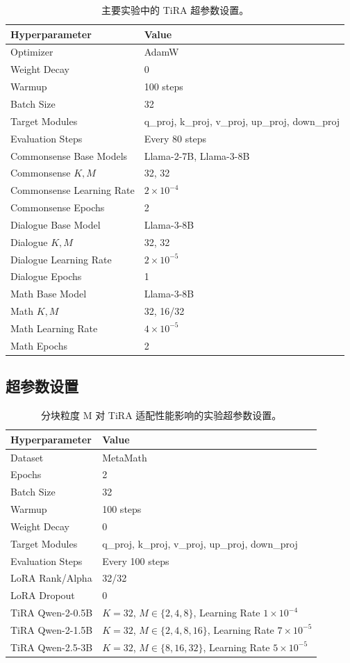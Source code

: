 ﻿\documentclass[UTF8,a4paper,11pt]{ctexart}
\begin{document}
\begin{table}[H]
\centering
\caption{主要实验中的 TiRA 超参数设置。}
\begin{tabular}{ll}
\toprule
Hyperparameter & Value \\
\midrule
Optimizer & AdamW \\
Weight Decay & 0 \\
Warmup & 100 steps \\
Batch Size & 32 \\
Target Modules & q\_proj, k\_proj, v\_proj, up\_proj, down\_proj \\
Evaluation Steps & Every 80 steps \\
\midrule
Commonsense Base Models & Llama-2-7B, Llama-3-8B \\
Commonsense $K,M$ & 32, 32 \\
Commonsense Learning Rate & $2\times10^{-4}$ \\
Commonsense Epochs & 2 \\
\midrule
Dialogue Base Model & Llama-3-8B \\
Dialogue $K,M$ & 32, 32 \\
Dialogue Learning Rate & $2\times10^{-5}$ \\
Dialogue Epochs & 1 \\
\midrule
Math Base Model & Llama-3-8B \\
Math $K,M$ & 32, 16/32 \\
Math Learning Rate & $4\times10^{-5}$ \\
Math Epochs & 2 \\
\bottomrule
\end{tabular}
\end{table}

\subsection{超参数设置}
\label{app:ablation_hyperparams}

\begin{table}[H]
\centering
\caption{分块粒度 M 对 TiRA 适配性能影响的实验超参数设置。}
\begin{tabular}{ll}
\toprule
Hyperparameter & Value \\
\midrule
Dataset & MetaMath \\
Epochs & 2 \\
Batch Size & 32 \\
Warmup & 100 steps \\
Weight Decay & 0 \\
Target Modules & q\_proj, k\_proj, v\_proj, up\_proj, down\_proj \\
Evaluation Steps & Every 100 steps \\
\midrule
LoRA Rank/Alpha & 32/32 \\
LoRA Dropout & 0 \\
\midrule
TiRA Qwen-2-0.5B & $K=32$, $M\in\{2,4,8\}$, Learning Rate $1\times10^{-4}$ \\
TiRA Qwen-2-1.5B & $K=32$, $M\in\{2,4,8,16\}$, Learning Rate $7\times10^{-5}$ \\
TiRA Qwen-2.5-3B & $K=32$, $M\in\{8,16,32\}$, Learning Rate $5\times10^{-5}$ \\
\bottomrule
\end{tabular}
\end{table}
\end{document}
